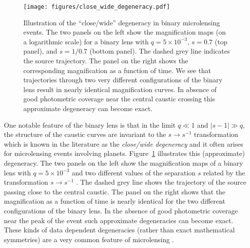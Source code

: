 \documentclass[12pt,dvipsnames]{report}
\begin{document}
\begin{figure}[t]
    \centering
    \texttt{[image: figures/close\_wide\_degeneracy.pdf]}
    \caption{Illustration of the ``close/wide'' degeneracy in binary microlensing events.
        The two panels on the left show the magnification maps (on a logarithmic scale) for
        a binary lens with $q=5\times 10^{-3}$, $s=0.7$ (top panel), and $s=1/0.7$
        (bottom panel). The dashed grey line indicates the source trajectory. The panel
        on the right shows the corresponding magnification as a function of time.
        We see that trajectories through two very different configurations of the binary lens
        result in nearly identical magnification curves. In absence of good
        photometric coverage near the central caustic crossing this approximate degeneracy
        can become exact.}
    \label{fig:close_wide_degeneracy}
\end{figure}

One notable feature of the binary lens is that in the limit $q\ll 1$ and
$\lvert s-1\rvert \gg q$, the structure of the caustic curves are invariant to
the $s\rightarrow s^{-1}$ transformation \citet{dominik1999} which is known in
the literature as the \emph{close/wide degeneracy} and it often arises for
microlensing events involving planets. Figure~\ref{fig:close_wide_degeneracy}
illustrates this (approximate) degeneracy. The two panels on the left show the
magnification maps of a binary lens with $q=5\times 10^{-3}$ and two different
values of the separation $s$ related by the transformation $s\rightarrow
    s^{-1}$ . The dashed grey line shows the trajectory of the source passing close
to the central caustic. The panel on the right shows that the magnification as
a function of time is nearly identical for the two different configurations of
the binary lens. In the absence of good photometric coverage near the peak of
the event such approximate degeneracies can become exact. These kinds of data
dependent degeneracies (rather than exact mathematical symmetries) are a very
common feature of microlensing \citep{erdl1993}.
\end{document}
